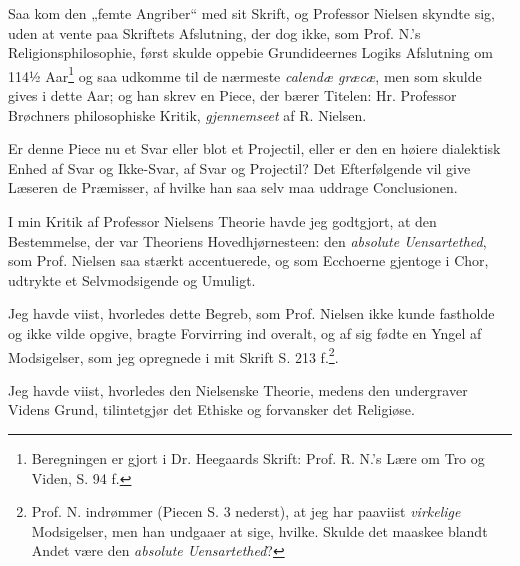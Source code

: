 \documentclass[12pt,a4paper]{book}
\newcommand{\opage}[1]{\marginnote{\footnotesize\textit{[#1]}}}
\begin{document}
Saa kom den „femte Angriber“ med sit Skrift, og Professor Nielsen skyndte sig,
uden at vente paa Skriftets Afslutning, der dog ikke, som Prof. N.'s
Religionsphilosophie, først skulde oppebie Grundideernes Logiks Afslutning om
114½ Aar\footnote{%
  Beregningen er gjort i Dr. Heegaards Skrift: Prof. R. N.'s Lære om Tro og
  Viden, S. 94 f.}
og saa udkomme til de nærmeste \textit{calendæ græcæ}, men som skulde gives i
dette Aar; og han skrev en Piece, der bærer Titelen: Hr. Professor Brøchners
philosophiske Kritik, \emph{gjennemseet} af R. Nielsen.

\opage{4} \setcounter{footnote}{0}
Er denne Piece nu et Svar eller blot et Projectil, eller er den en høiere
dialektisk Enhed af Svar og Ikke-Svar, af Svar og Projectil? Det Efterfølgende
vil give Læseren de Præmisser, af hvilke han saa selv maa uddrage Conclusionen.

I min Kritik af Professor Nielsens Theorie havde jeg godtgjort, at den
Bestemmelse, der var Theoriens Hovedhjørnesteen: den \emph{absolute
Uensartethed}, som Prof. Nielsen saa stærkt accentuerede, og som Ecchoerne
gjentoge i Chor, udtrykte et Selvmodsigende og Umuligt.

Jeg havde viist, hvorledes dette Begreb, som Prof. Nielsen ikke kunde fastholde
og ikke vilde opgive, bragte Forvirring ind overalt, og af sig fødte en Yngel af
Modsigelser, som jeg opregnede i mit Skrift S. 213 f.\footnote{%
  Prof. N. indrømmer (Piecen S. 3 nederst), at jeg har paaviist
  \emph{virkelige} Modsigelser, men han undgaaer at sige, hvilke. Skulde det
  maaskee blandt Andet være den \emph{absolute Uensartethed}?}.

Jeg havde viist, hvorledes den Nielsenske Theorie, medens den undergraver Videns
Grund, tilintetgjør det Ethiske og forvansker det Religiøse.
\end{document}
